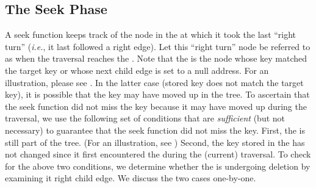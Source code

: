 \subsection{The Seek Phase}
A seek function keeps track of the node in the \accesspath{} at which it took the last ``right turn'' (\emph{i.e.}, it last followed a right edge). Let this ``right turn'' node be referred to as \emph{\anchornode} when the traversal reaches the \terminalnode{}. Note that the \terminalnode{} is the node whose key matched the target key or whose next child edge is set to a null address. For an illustration, please see . In the latter case (stored key does not match the target key), it is possible that the key may have moved up in the tree. To ascertain that the seek function did not miss the key because it may have moved up during the traversal, we use the following set of conditions that are \emph{sufficient} (but not necessary) to guarantee that the seek function did not miss the key. First, the \anchornode{} is still part of the tree. (For an illustration, see ) Second, the key stored in the \anchornode{} has not changed since it first encountered the \anchornode{} during the (current) traversal. To check for the above two conditions, we determine whether the \anchornode{} is undergoing deletion by examining it right child edge. We discuss the two cases one-by-one.


